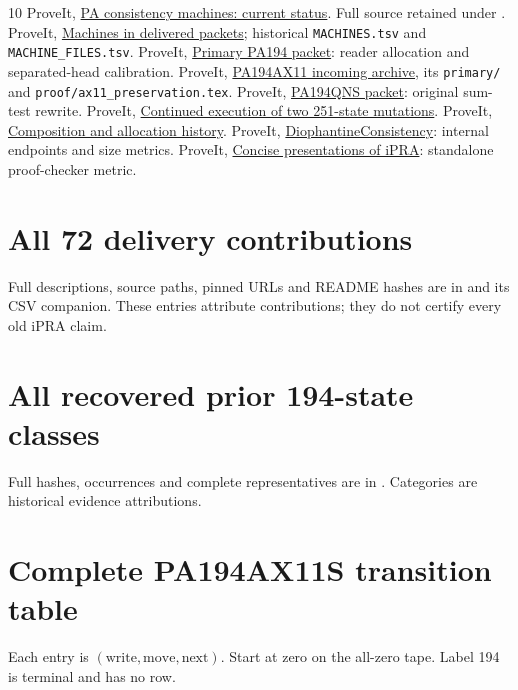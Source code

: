\documentclass[11pt,letterpaper]{article}
\newcommand{\repo}{https://github.com/VladimirReshetnikov/ProveIt}
\newcommand{\pin}{1c9524d8bf2e0a27b9a16ff622359927f536e663}
\begin{document}
\clearpage
\begin{thebibliography}{10}
 ProveIt, \href{\repo/blob/\pin/Computability/BusyBeaver/Research/PA/README.md}{PA consistency machines: current status}. Full source retained under .
 ProveIt, \href{\repo/blob/\pin/Computability/BusyBeaver/Research/PA/docs/MACHINES.md}{Machines in delivered packets}; historical \texttt{MACHINES.tsv} and \texttt{MACHINE\_FILES.tsv}.
 ProveIt, \href{\repo/tree/\pin/Computability/BusyBeaver/Research/PA/docs/pa194_conpa_2026-11-13}{Primary PA194 packet}: reader allocation and separated-head calibration.
 ProveIt, \href{\repo/blob/\pin/docs/incoming/pa194_ax11_research_2026-11-14.zip}{PA194AX11 incoming archive}, its \texttt{primary/} and \texttt{proof/ax11\_preservation.tex}.
 ProveIt, \href{\repo/tree/\pin/Computability/BusyBeaver/Research/PA/docs/pa194qns_research_2026-11-13}{PA194QNS packet}: original sum-test rewrite.
 ProveIt, \href{\repo/blob/\pin/Computability/BusyBeaver/Research/ZFC/phase-entry/continuation/README.md}{Continued execution of two 251-state mutations}.
 ProveIt, \href{\repo/blob/\pin/Computability/BusyBeaver/Research/ZFC/candidate-k215/research/composition-allocation/README.md}{Composition and allocation history}.
 ProveIt, \href{\repo/blob/\pin/Computability/DiophantineConsistency/README.md}{DiophantineConsistency}: internal endpoints and size metrics.
 ProveIt, \href{\repo/blob/\pin/Logic/PrimitiveRecursiveArithmetic/ConciseIPRA/README.md}{Concise presentations of iPRA}: standalone proof-checker metric.
\end{thebibliography}

\appendix\clearpage
\section{All 72 delivery contributions}
Full descriptions, source paths, pinned URLs and README hashes are in
 and its CSV companion. These entries
attribute contributions; they do not certify every old iPRA claim.

\clearpage\section{All recovered prior 194-state classes}
Full hashes, occurrences and complete representatives are in
. Categories are historical evidence attributions.

\clearpage\section{Complete PA194AX11S transition table}
Each entry is $(\text{write},\text{move},\text{next})$. Start at zero on
the all-zero tape. Label 194 is terminal and has no row.

\end{document}
